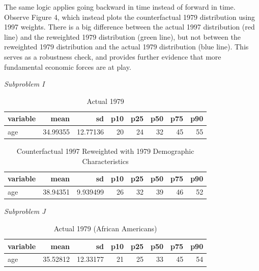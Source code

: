 \documentclass[11pt]{article}
\begin{document}
\bigskip The same logic applies going backward in time instead of forward in time. Observe Figure 4, which instead plots the counterfactual 1979 distribution using 1997 weights. There is a big difference between the actual 1997 distribution (red line) and the reweighted 1979 distribution (green line), but not between the reweighted 1979 distribution and the actual 1979 distribution (blue line). This serves as a robustness check, and provides further evidence that more fundamental economic forces are at play.

\bigskip \textit{Subproblem I}

\begin{table}[H]\centering
	\caption{Actual 1979}{\label{} 
		\textbf{} }\begin{tabular} {@{} l r r r r r r r @{}} \\ \hline
		\textbf{variable } & \textbf{      mean} & \textbf{        sd} & \textbf{       p10} &
		\textbf{       p25} & \textbf{       p50} & \textbf{       p75} & \textbf{       p90} \\
		\hline
		age  &   34.99355 &   12.77136 &         20 &         24 &         32 &        
		45 &         55 \\
		\hline
	\end{tabular}
\end{table}

\begin{table}[H]\centering
	\caption{Counterfactual 1997 Reweighted with 1979 Demographic Characteristics}{\label{} 
		\textbf{} }\begin{tabular} {@{} l r r r r r r r @{}} \\ \hline
		\textbf{variable } & \textbf{      mean} & \textbf{        sd} & \textbf{       p10} &
		\textbf{       p25} & \textbf{       p50} & \textbf{       p75} & \textbf{       p90} \\
		\hline
		age  &   38.94351 &   9.939499 &         26 &         32 &         39 &        
		46 &         52 \\
		\hline
	\end{tabular}
\end{table}

\bigskip \textit{Subproblem J}

\begin{table}[H]\centering
	\caption{Actual 1979 (African Americans)}{\label{} 
		\textbf{} }\begin{tabular} {@{} l r r r r r r r @{}} \\ \hline
		\textbf{variable } & \textbf{      mean} & \textbf{        sd} & \textbf{       p10} &
		\textbf{       p25} & \textbf{       p50} & \textbf{       p75} & \textbf{       p90} \\
		\hline
		age  &   35.52812 &   12.33177 &         21 &         25 &         33 &        
		45 &         54 \\
		\hline
	\end{tabular}
\end{table}
\end{document}
